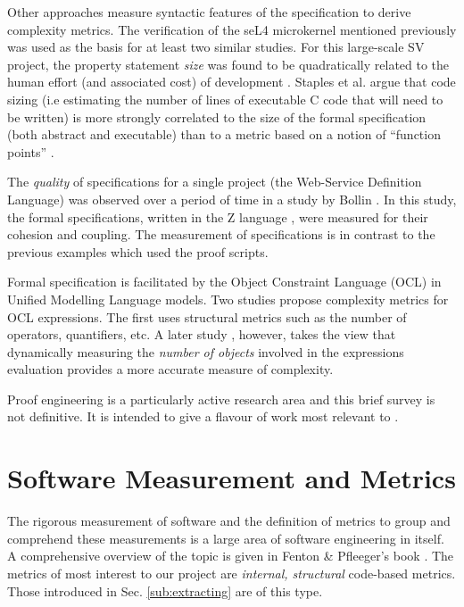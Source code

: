 Other approaches measure syntactic features of the specification to derive complexity metrics. The verification of the seL4 microkernel mentioned previously was used as the basis for at least two similar studies. For this large-scale SV project, the property statement \textit{size} was found to be quadratically related to the human effort (and associated cost) of development \cite{CostIndicator}. Staples et al. argue that code sizing (i.e estimating the number of lines of executable C code that will need to be written) is more strongly correlated to the size of the formal specification (both abstract and executable) than to a metric based on a notion of ``function points'' \cite{Staples:2013}.
   
The \textit{quality} of specifications for a single project (the Web-Service Definition Language) was observed over a period of time in a study by Bollin \cite{Zspecs}. In this study, the formal specifications, written in the Z language \cite{Zlang}, were measured for their cohesion and coupling. The measurement of specifications is in contrast to the previous examples \cite{Aspinall2016, CostIndicator} which used the proof scripts.

Formal specification is facilitated by the Object Constraint Language (OCL) in Unified Modelling Language models. Two studies propose complexity metrics for OCL expressions. The first \cite{TowardsOCL} uses structural metrics such as the number of operators, quantifiers, etc. A later study \cite{OCLalt}, however, takes the view that dynamically measuring the \textit{number of objects} involved in the expressions evaluation provides a more accurate measure of complexity.

Proof engineering is a particularly active research area and this brief survey is not definitive. It is intended to give a flavour of work most relevant to \where.     
 
       
\section{Software Measurement and Metrics}
\label{sec:lrmm}
The rigorous measurement of software and the definition of metrics to group and comprehend these measurements is a large area of software engineering in itself. A comprehensive overview of the topic is given in Fenton \& Pfleeger's book \cite{FentonPfleeger}. The metrics of most interest to our project are \textit{internal, structural} code-based metrics. Those introduced in Sec. \ref{sub:extracting} are of this type.

